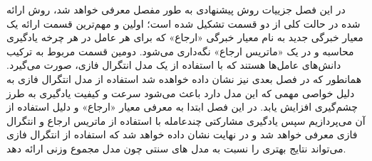 در این فصل جزییات روش پیشنهادی به طور مفصل معرفی خواهد شد، روش ارائه شده در حالت کلی از دو قسمت تشکیل شده است؛ اولین و مهم‌ترین قسمت ارائه یک معیار خبرگی جدید به نام معیار خبرگی «ارجاع» که برای هر عامل در هر چرخه یادگیری محاسبه و در یک «ماتریس ارجاع» نگه‌داری می‌شود. دومین قسمت مربوط به ترکیب دانش‌های عامل‌ها هستند که با استفاده از یک مدل انتگرال فازی، صورت می‌گیرد. همانطور که در فصل بعدی نیز نشان داده خواهده شد استفاده از مدل انتگرال فازی به دلیل خواصی مهمی که این مدل دارد باعث می‌شود سرعت و کیفیت یادگیری به طرز چشم‌گیری افزایش یابد. در این فصل ابتدا به معرفی معیار «ارجاع» و دلیل استفاده از آن می‌پردازیم سپس یادگیری مشارکتی چندعامله با استفاده از ماتریس ارجاع و انتگرال فازی معرفی خواهد شد و در نهایت نشان داده خواهد شد که استفاده از انتگرال فازی می‌تواند نتایج بهتری را نسبت به مدل های سنتی چون مدل مجموع وزنی ارائه دهد.